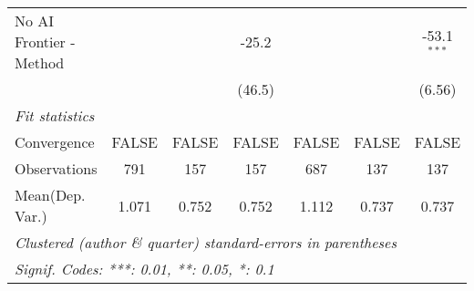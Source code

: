 \begin{tabular}{lcccccc}
   No AI Frontier - Method &             &               & -25.2          &            &              & -53.1$^{***}$\\   
                           &             &               & (46.5)         &            &              & (6.56)\\   
   \midrule
   \emph{Fit statistics}\\
   Convergence             &FALSE        & FALSE         & FALSE          & FALSE      & FALSE        & FALSE\\  
   Observations            & 791         & 157           & 157            & 687        & 137          & 137\\  
Mean(Dep. Var.) & 1.071 & 0.752 & 0.752 & 1.112 & 0.737 & 0.737 \\
   \midrule \midrule
   \multicolumn{7}{l}{\emph{Clustered (author \& quarter) standard-errors in parentheses}}\\
   \multicolumn{7}{l}{\emph{Signif. Codes: ***: 0.01, **: 0.05, *: 0.1}}\\
\end{tabular}
\par\endgroup
